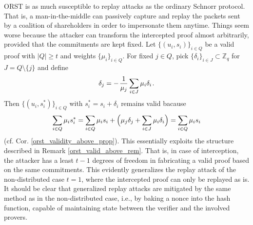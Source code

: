 \documentclass[10pt, psamsfonts, reqno]{amsart}
\theoremstyle{definition}
\theoremstyle{remark}
\numberwithin{equation}{section}
\begin{document}
\textsf{ORST}
is as much susceptible to replay attacks
as the ordinary Schnorr protocol.
That is, a man-in-the-middle
can passively capture and replay
the packets sent by a coalition
of shareholders in order to impersonate them anytime.
Things seem worse
because the attacker can transform the
intercepted proof
almost arbitrarily,
provided that the commitments are kept fixed.
Let
$\{(u_i, s_i)\}_{i \in Q}$ be a
valid proof with $|Q| \ge t$ and weights $\{\mu_i\}_{i \in Q}$.
For fixed $j \in Q$,
pick $\{\delta_i\}_{i \in J} \subset \mathbb{Z}_q$
for $J = Q \setminus \{j\}$ and define
\vspace{5pt}
\begin{equation*}
\delta_j = -\hspace{1pt} \frac{1}{\mu_j}\sum_{i \in J} \mu_i \delta_i\hspace{1pt}.
\vspace{5pt}
\end{equation*}
Then $\{(u_i, s_i^*)\}_{i \in Q}$ with
$s_i^* = s_i + \delta_i$ remains valid bacause
\vspace{5pt}
\begin{equation*}
\sum_{i \in Q} \mu_i s_i^* =
\sum_{i \in Q} \mu_i s_i + \Big(\mu_j \delta_j + \sum_{i \in J} \mu_i \delta_i\Big) = 
\sum_{i \in Q} \mu_i s_i
\vspace{5pt}
\end{equation*}
\noindent
(cf. Cor. \ref{orst_validity_above_prop}).
This essentially exploits the structure described in
Remark \ref{orst_valid_above_rem}.
That is, in case of interception,
the attacker has a least $t-1$ degrees of freedom
in fabricating a valid proof based on the same commitments.
This evidently generalizes the replay attack of the non-distributed
case $t=1$, where the intercepted proof can only be replayed as is.
It should be clear that
generalized replay attacks are
mitigated by the same method as in the non-distributed case,
i.e., by baking a nonce into the hash function,
capable of maintaining state between
the verifier and the involved provers.
\end{document}

